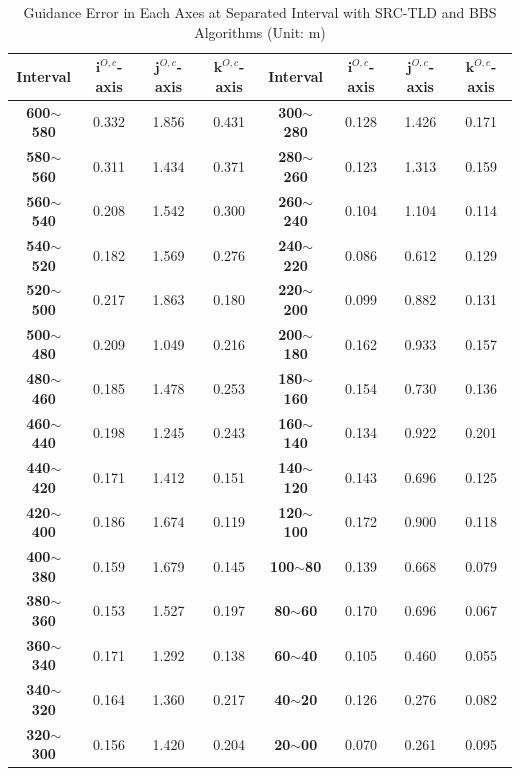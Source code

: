 \begin{table}[!th]
	\centering
	\caption{Guidance Error in Each Axes at Separated Interval with SRC-TLD and BBS Algorithms (Unit: m)}
	\label{lab:ground_landing}
	\begin{tabular}{cccc|cccc}
		\hline
		\textbf{Interval} & \textbf{$\mathbf{i}^{O,c}$-axis} & \textbf{$\mathbf{j}^{O,c}$-axis} & \textbf{$\mathbf{k}^{O,c}$-axis} & \textbf{Interval} & \textbf{$\mathbf{i}^{O,c}$-axis} & \textbf{$\mathbf{j}^{O,c}$-axis} & \textbf{$\mathbf{k}^{O,c}$-axis} \\ \hline
		\textbf{600$\sim$580} & 0.332 & 1.856 & 0.431 & \textbf{300$\sim$280} & 0.128 & 1.426 & 0.171 \\
		\textbf{580$\sim$560} & 0.311 & 1.434 & 0.371 & \textbf{280$\sim$260} & 0.123 & 1.313 & 0.159 \\
		\textbf{560$\sim$540} & 0.208 & 1.542 & 0.300 & \textbf{260$\sim$240} & 0.104 & 1.104 & 0.114 \\
		\textbf{540$\sim$520} & 0.182 & 1.569 & 0.276 & \textbf{240$\sim$220} & 0.086 & 0.612 & 0.129 \\
		\textbf{520$\sim$500} & 0.217 & 1.863 & 0.180 & \textbf{220$\sim$200} & 0.099 & 0.882 & 0.131 \\
		\textbf{500$\sim$480} & 0.209 & 1.049 & 0.216 & \textbf{200$\sim$180} & 0.162 & 0.933 & 0.157 \\
		\textbf{480$\sim$460} & 0.185 & 1.478 & 0.253 & \textbf{180$\sim$160} & 0.154 & 0.730 & 0.136 \\
		\textbf{460$\sim$440} & 0.198 & 1.245 & 0.243 & \textbf{160$\sim$140} & 0.134 & 0.922 & 0.201 \\
		\textbf{440$\sim$420} & 0.171 & 1.412 & 0.151 & \textbf{140$\sim$120} & 0.143 & 0.696 & 0.125 \\
		\textbf{420$\sim$400} & 0.186 & 1.674 & 0.119 & \textbf{120$\sim$100} & 0.172 & 0.900 & 0.118 \\
		\textbf{400$\sim$380} & 0.159 & 1.679 & 0.145 & \textbf{100$\sim$80} & 0.139 & 0.668 & 0.079 \\
		\textbf{380$\sim$360} & 0.153 & 1.527 & 0.197 & \textbf{80$\sim$60} & 0.170 & 0.696 & 0.067 \\
		\textbf{360$\sim$340} & 0.171 & 1.292 & 0.138 & \textbf{60$\sim$40} & 0.105 & 0.460 & 0.055 \\
		\textbf{340$\sim$320} & 0.164 & 1.360 & 0.217 & \textbf{40$\sim$20} & 0.126 & 0.276 & 0.082 \\
		\textbf{320$\sim$300} & 0.156 & 1.420 & 0.204 & \textbf{20$\sim$00} & 0.070 & 0.261 & 0.095 \\ \hline
	\end{tabular}
\end{table}

